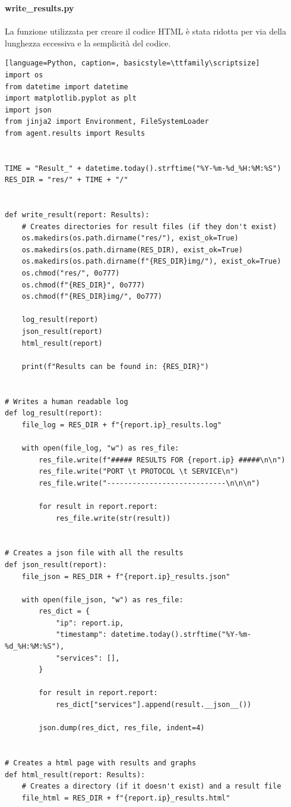 \documentclass[12pt]{report}
\begin{document}
\noindent
\textbf{write\_results.py}
\\\\
La funzione utilizzata per creare il codice HTML è stata ridotta per via della lunghezza eccessiva e la semplicità del codice.
\begin{lstlisting}[language=Python, caption=, basicstyle=\ttfamily\scriptsize]
import os
from datetime import datetime
import matplotlib.pyplot as plt
import json
from jinja2 import Environment, FileSystemLoader
from agent.results import Results


TIME = "Result_" + datetime.today().strftime("%Y-%m-%d_%H:%M:%S")
RES_DIR = "res/" + TIME + "/"


def write_result(report: Results):
    # Creates directories for result files (if they don't exist)
    os.makedirs(os.path.dirname("res/"), exist_ok=True)
    os.makedirs(os.path.dirname(RES_DIR), exist_ok=True)
    os.makedirs(os.path.dirname(f"{RES_DIR}img/"), exist_ok=True)
    os.chmod("res/", 0o777)
    os.chmod(f"{RES_DIR}", 0o777)
    os.chmod(f"{RES_DIR}img/", 0o777)

    log_result(report)
    json_result(report)
    html_result(report)

    print(f"Results can be found in: {RES_DIR}")


# Writes a human readable log
def log_result(report):
    file_log = RES_DIR + f"{report.ip}_results.log"

    with open(file_log, "w") as res_file:
        res_file.write(f"##### RESULTS FOR {report.ip} #####\n\n")
        res_file.write("PORT \t PROTOCOL \t SERVICE\n")
        res_file.write("----------------------------\n\n\n")

        for result in report.report:
            res_file.write(str(result))


# Creates a json file with all the results
def json_result(report):
    file_json = RES_DIR + f"{report.ip}_results.json"

    with open(file_json, "w") as res_file:
        res_dict = {
            "ip": report.ip,
            "timestamp": datetime.today().strftime("%Y-%m-%d_%H:%M:%S"),
            "services": [],
        }

        for result in report.report:
            res_dict["services"].append(result.__json__())

        json.dump(res_dict, res_file, indent=4)


# Creates a html page with results and graphs
def html_result(report: Results):
    # Creates a directory (if it doesn't exist) and a result file
    file_html = RES_DIR + f"{report.ip}_results.html"


\end{lstlisting}
\end{document}
